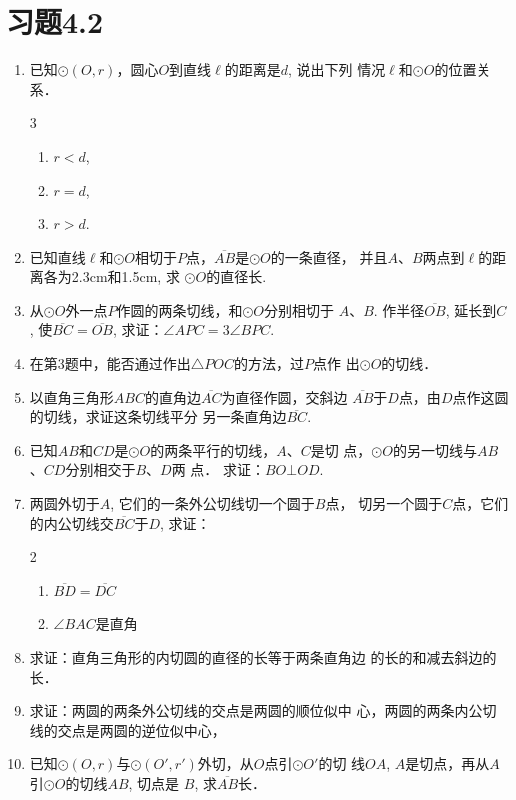 \section*{习题4.2}
\begin{enumerate}
    \item 已知$\odot(O,r)$，圆心$O$到直线$\ell$的距离是$d$, 说出下列
    情况$\ell$和$\odot O$的位置关系．
\begin{multicols}{3}
    \begin{enumerate}
        \item $r<d$,
        \item $r=d$,
        \item $r>d$.
    \end{enumerate}
\end{multicols}

    \item 已知直线$\ell$和$\odot O$相切于$P$点，$\overline{AB}$是$\odot O$的一条直径，
    并且$A$、$B$两点到$\ell$的距离各为2.3cm和1.5cm, 求
    $\odot O$的直径长.
    \item 从$\odot O$外一点$P$作圆的两条切线，和$\odot O$分别相切于
$A$、$B$. 作半径$\overline{OB}$, 延长到$C$, 使$\overline{BC}=\overline{OB}$, 
求证：$\angle APC=3\angle BPC$.
\item 在第3题中，能否通过作出$\triangle POC$的方法，过$P$点作
出$\odot O$的切线．
\item 以直角三角形$ABC$的直角边$\overline{AC}$为直径作圆，交斜边
$\overline{AB}$于$D$点，由$D$点作这圆的切线，求证这条切线平分
另一条直角边$\overline{BC}$.
\item 已知$AB$和$CD$是$\odot O$的两条平行的切线，$A$、$C$是切
点，$\odot O$的另一切线与$AB$、$CD$分别相交于$B$、$D$两
点．
求证：$BO\bot OD$.
\item 两圆外切于$A$, 它们的一条外公切线切一个圆于$B$点，
切另一个圆于$C$点，它们的内公切线交$\overline{BC}$于$D$, 求证：
\begin{multicols}{2}
    \begin{enumerate}
        \item $\overline{BD}=\overline{DC}$
        \item $\angle BAC$是直角
    \end{enumerate}
\end{multicols}

\item 求证：直角三角形的内切圆的直径的长等于两条直角边
的长的和减去斜边的长．
\item 求证：两圆的两条外公切线的交点是两圆的顺位似中
心，两圆的两条内公切线的交点是两圆的逆位似中心，
\item 已知$\odot (O,r)$与$\odot (O',r')$外切，从$O$点引$\odot O'$的切
线$OA$, $A$是切点，再从$A$引$\odot O$的切线$AB$, 切点是
$B$, 求$\overline{AB}$长．
\end{enumerate}

